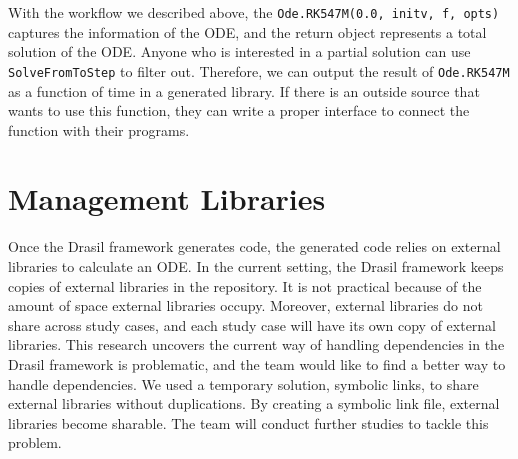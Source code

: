 With the workflow we described above, the \verb|Ode.RK547M(0.0, initv, f, opts)| captures the information of the ODE, and the return object represents a total solution of the ODE. Anyone who is interested in a partial solution can use \verb|SolveFromToStep| to filter out. Therefore,
we can output the result of \verb|Ode.RK547M| as a function of time in a generated library. If there is an outside source that wants to use this function, they can write a proper interface to connect the function with their programs. 

\section{Management Libraries}
Once the Drasil framework generates code, the generated code relies on external libraries to calculate an ODE. In the current setting, the Drasil framework keeps copies of external libraries in the repository. It is not practical because of the amount of space external libraries occupy. Moreover, external libraries do not share across study cases, and each study case will have its own copy of external libraries. This research uncovers the current way of handling dependencies in the Drasil framework is problematic, and the team would like to find a better way to handle dependencies. We used a temporary solution, symbolic links, to share external libraries without duplications. By creating a symbolic link file, external libraries become sharable. The team will conduct further studies to tackle this problem.
